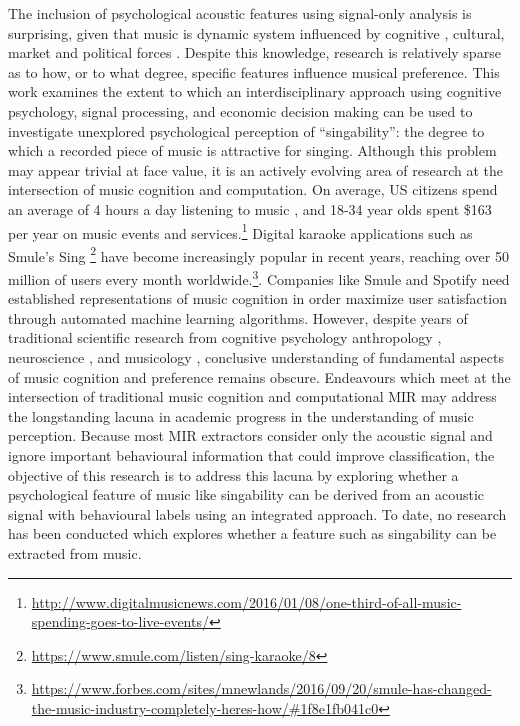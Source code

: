 The inclusion of psychological acoustic features using signal-only analysis is surprising, given that music is dynamic system influenced by cognitive \cite{koelsch2005towards}, cultural, market and political forces \cite{bielby2004managing}. Despite this knowledge, research is relatively sparse as to how, or to what degree, specific features influence musical preference. This work examines the extent to which an interdisciplinary approach using cognitive psychology, signal processing, and economic decision making can be used to investigate unexplored psychological perception of ``singability'': the degree to which a recorded piece of music is attractive for singing. Although this problem may appear trivial at face value, it is an actively evolving area of research at the intersection of music cognition and computation. On average, US citizens spend an average of 4 hours a day listening to music \cite{webster2015share}, and 18-34 year olds spent \$163 per year on music events and services.\footnote{\url{http://www.digitalmusicnews.com/2016/01/08/one-third-of-all-music-spending-goes-to-live-events/}} Digital karaoke applications such as Smule's Sing \footnote{\url{https://www.smule.com/listen/sing-karaoke/8}} have become increasingly popular in recent years, reaching over 50 million of users every month worldwide.\footnote{\url{https://www.forbes.com/sites/mnewlands/2016/09/20/smule-has-changed-the-music-industry-completely-heres-how/\#1f8e1fb041c0}}. Companies like Smule and Spotify need established representations of music cognition in order maximize user satisfaction through automated machine learning algorithms. However, despite years of traditional scientific research from cognitive psychology \cite{pinker1999mind,huron2001music,cross2012music} anthropology \cite{mithen2006singing,patel2003language}, neuroscience \cite{peretz2005brain}, and musicology \cite{wallin2001origins}, conclusive understanding of fundamental aspects of music cognition and preference remains obscure. Endeavours which meet at the intersection of traditional music cognition and computational MIR may address the longstanding lacuna in academic progress in the understanding of music perception. Because most MIR extractors consider only the acoustic signal and ignore important behavioural information that could improve classification, the objective of this research is to address this lacuna by exploring whether a psychological feature of music like singability can be derived from an acoustic signal with behavioural labels using an integrated approach. To date, no research has been conducted which explores whether a feature such as singability can be extracted from music.

